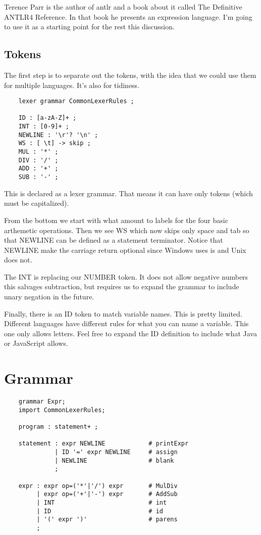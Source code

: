 Terence Parr is the author of antlr and a book about it called
The Definitive ANTLR4 Reference. In that book he presents an expression
language. I'm going to use it as a starting point for the rest this
discussion.

\subsection{Tokens}

The first step is to separate out the tokens, with the idea that
we could use them for multiple languages. It's also for tidiness.

{\footnotesize
\begin{verbatim}
    lexer grammar CommonLexerRules ;

    ID : [a-zA-Z]+ ;
    INT : [0-9]+ ;
    NEWLINE : '\r'? '\n' ;
    WS : [ \t] -> skip ;
    MUL : '*' ;
    DIV : '/' ;
    ADD : '+' ;
    SUB : '-' ;
\end{verbatim}
}

This is declared as a lexer grammar. That means it can have only
tokens (which must be capitalized).

From the bottom we start with what amount to labels for the four
basic arthemetic operations. Then we see WS which now skips only space and tab
so that NEWLINE can be defined as a statement terminator. Notice
that NEWLINE make the carriage return optional since Windows uses
is and Unix does not.

The INT is replacing our NUMBER token. It does not allow negative
numbers this salvages subtraction, but requires us to expand
the grammar to include unary negation in the future.

Finally, there is an ID token to match variable names. This is
pretty limited. Different languages have different rules for what
you can name a variable. This one only allows letters. Feel free
to expand the ID definition to include what Java or JavaScript allows.

\section{Grammar}

{\footnotesize
\begin{verbatim}
    grammar Expr;
    import CommonLexerRules;
    
    program : statement+ ;
    
    statement : expr NEWLINE            # printExpr
              | ID '=' expr NEWLINE     # assign
              | NEWLINE                 # blank
              ;
    
    expr : expr op=('*'|'/') expr       # MulDiv
         | expr op=('+'|'-') expr       # AddSub
         | INT                          # int
         | ID                           # id
         | '(' expr ')'                 # parens
         ;
\end{verbatim}
}

